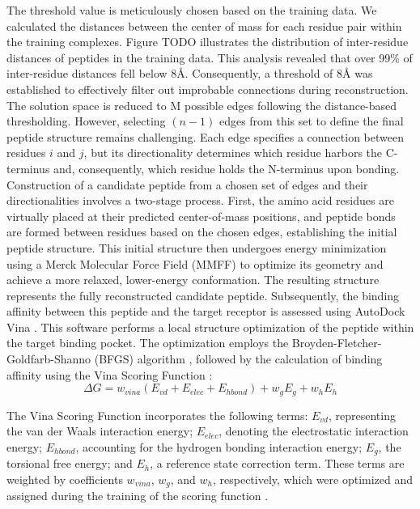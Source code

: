 The threshold value is meticulously chosen based on the training data. We calculated the distances between the center of mass for each residue pair within the training complexes. Figure TODO illustrates the distribution of inter-residue distances of peptides in the training data. This analysis revealed that over 99\% of inter-residue distances fell below 8Å. Consequently, a threshold of 8Å was established to effectively filter out improbable connections during reconstruction. \\
The solution space is reduced to M possible edges following the distance-based thresholding. However, selecting $(n-1)$ edges from this set to define the final peptide structure remains challenging. Each edge specifies a connection between residues $i$ and $j$, but its directionality determines which residue harbors the C-terminus and, consequently, which residue holds the N-terminus upon bonding.  \\

Construction of a candidate peptide from a chosen set of edges and their directionalities involves a two-stage process. First, the amino acid residues are virtually placed at their predicted center-of-mass positions, and peptide bonds are formed between residues based on the chosen edges, establishing the initial peptide structure. This initial structure then undergoes energy minimization using a Merck Molecular Force Field (MMFF) \cite{halgren1996merck} to optimize its geometry and achieve a more relaxed, lower-energy conformation. The resulting structure represents the fully reconstructed candidate peptide. Subsequently, the binding affinity between this peptide and the target receptor is assessed using AutoDock Vina \cite{trott2010autodock}. This software performs a local structure optimization of the peptide within the target binding pocket. The optimization employs the Broyden-Fletcher-Goldfarb-Shanno (BFGS) algorithm \cite{head1985broyden}, followed by the calculation of binding affinity using the Vina Scoring Function \cite{trott2010autodock}:
$$\Delta G = w_{vina}(E_{vd}+ E_{elec} + E_{hbond}) + w_gE_g + w_hE_h$$

The Vina Scoring Function incorporates the following terms: $E_{vd}$, representing the van der Waals interaction energy; $E_{elec}$, denoting the electrostatic interaction energy; $E_{hbond}$, accounting for the hydrogen bonding interaction energy; $E_g$, the torsional free energy; and $E_h$, a reference state correction term. These terms are weighted by coefficients $w_{vina}$, $w_g$, and $w_h$, respectively, which were optimized and assigned during the training of the scoring function \cite{trott2010autodock}. \\

